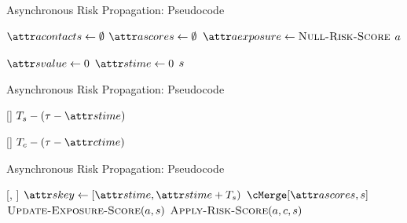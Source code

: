 \documentclass[11pt]{beamer}
\begin{document}

\begin{frame}{Asynchronous Risk Propagation: Pseudocode}
\begin{function}{\nCreateActor}
  \State $\aActorContacts \assign \emptyset$
  \State $\aActorScores \assign \emptyset$
  \State $\aActorExposure \assign \cNullRiskScore$
  \State \Return $a$
\end{function}
\begin{function}{\nNullRiskScore}
  \State $\aScoreValue \assign 0$
  \State $\aScoreTime \assign 0$
  \State \Return $s$
\end{function}
\end{frame}

\begin{frame}{Asynchronous Risk Propagation: Pseudocode}
\begin{function}{\nRiskScoreTtl}[\vScore]
  \State \Return $\pScoreExpiry - (\vReferenceTime - \aScoreTime)$
\end{function}
\begin{function}{\nContactTtl}[\vContact]
  \State \Return $\pContactExpiry - (\vReferenceTime - \aContactTime)$
\end{function}
\end{frame}

\begin{frame}{Asynchronous Risk Propagation: Pseudocode}
\begin{function}{\nHandleRiskScore}[\vActor, \vScore]
    \pause
    \State $\aScoreKey \assign [\aScoreTime, \aScoreTime + \pScoreExpiry)$
    \pause
    \State $\cMerge[\aActorScores, \vScore]$
    \pause
    \State $\cUpdateExposureScore[\vActor, \vScore]$
    \pause
    \ForEach{$\vContact \in \aActorContacts$}
      \State $\cApplyRiskScore[\vActor, \vContact, \vScore]$
    \EndFor
  \EndIf
\end{function}
\end{frame}
\end{document}
